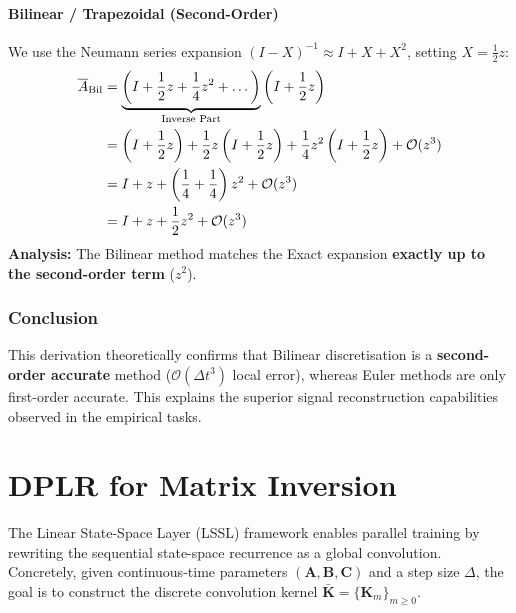 \documentclass[a4paper,11pt]{article}
\begin{document}
\paragraph{Bilinear / Trapezoidal (Second-Order)}
We use the Neumann series expansion $(I - X)^{-1} \approx I + X + X^2$, setting $X = \frac{1}{2}z$:
\begin{align}
    \overline{A}_{\text{Bil}} &= \underbrace{\left( I + \frac{1}{2}z + \frac{1}{4}z^2 + \dots \right)}_{\text{Inverse Part}} \left( I + \frac{1}{2}z \right) \notag \\
    &= \left(I + \frac{1}{2}z\right) + \frac{1}{2}z\left(I + \frac{1}{2}z\right) + \frac{1}{4}z^2\left(I + \frac{1}{2}z\right) + \mathcal{O}(z^3) \notag \\
    &= I + z + \left( \frac{1}{4} + \frac{1}{4} \right)z^2 + \mathcal{O}(z^3) \notag \\
    &= I + z + \frac{1}{2}z^2 + \mathcal{O}(z^3) \label{eq:taylor_bilinear}
\end{align}
\textbf{Analysis:} The Bilinear method matches the Exact expansion \textbf{exactly up to the second-order term} ($z^2$).

\subsubsection{Conclusion}
This derivation theoretically confirms that Bilinear discretisation is a \textbf{second-order accurate} method ($\mathcal{O}(\Delta t^3)$ local error), whereas Euler methods are only first-order accurate. This explains the superior signal reconstruction capabilities observed in the empirical tasks.





\section{DPLR for Matrix Inversion}\label{app:dplr}

The Linear State-Space Layer (LSSL) framework enables parallel training by rewriting the sequential state-space recurrence as a global convolution. Concretely, given continuous-time parameters $(\mathbf{A},\mathbf{B},\mathbf{C})$ and a step size $\Delta$, the goal is to construct the discrete convolution kernel $\bar{\mathbf{K}}=\{\mathbf{K}_m\}_{m\ge 0}$.
\end{document}
